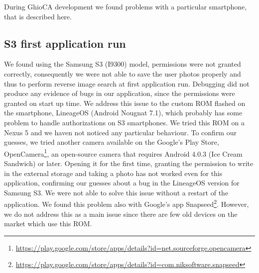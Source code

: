 During GhioCA development we found problems with a particular smartphone, that is described here.

\subsection{S3 first application run}

We found using the Samsung S3 (I9300) model, permissions were not granted correctly, consequently we were not able to save the user photos properly and thus to perform reverse image search at first application run. Debugging did not produce any evidence of bugs in our application, since the permissions were granted on start up time.
We address this issue to the custom ROM flashed on the smartphone, LineageOS (Android Nougnat 7.1), which probably has some problem to handle authorizations on S3 smartphones. We tried this ROM on a Nexus 5 and we haven not noticed any particular behaviour.
To confirm our guesses, we tried another camera available on the Google's Play Store, OpenCamera\footnote{\url{https://play.google.com/store/apps/details?id=net.sourceforge.opencamera}}, an open-source camera that requires Android 4.0.3 (Ice Cream Sandwich) or later.
Opening it for the first time, granting the permission to write in the external storage and taking a photo has not worked even for this application, confirming our guesses about a bug in the LineageOS version for Samsung S3.
We were not able to solve this issue without a restart of the application. We found this problem also with Google's app Snapseed\footnote{\url{https://play.google.com/store/apps/details?id=com.niksoftware.snapseed}}.
However, we do not address this as a main issue since there are few old devices on the market which use this ROM.
